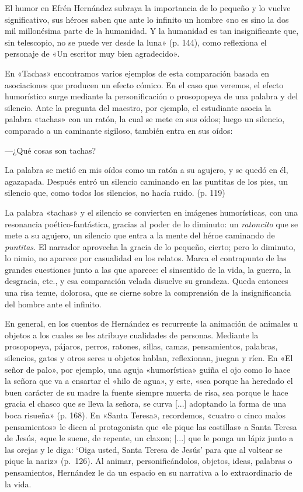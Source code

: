 \documentclass[14pt,twoside,final]{extbook} %
\begin{document}
El humor en Efrén Hernández subraya la importancia de lo pequeño y lo vuelve significativo, sus héroes saben que ante lo infinito un hombre «no es sino la dos mil millonésima parte de la humanidad. Y la humanidad es tan insignificante que, sin telescopio, no se puede ver desde la luna» (p. 144), como reflexiona el personaje de «Un escritor muy bien agradecido».

En «Tachas» encontramos varios ejemplos de esta comparación basada en asociaciones que producen un efecto cómico. En el caso que veremos, el efecto humorístico surge mediante la personificación o prosopopeya de una palabra y del silencio. Ante la pregunta del maestro, por ejemplo, el estudiante asocia la palabra «tachas» con un ratón, la cual se mete en sus oídos; luego un silencio, comparado a un caminante sigiloso, también entra en sus oídos:
\begin{quoting}
---¿Qué cosas son tachas?

La palabra se metió en mis oídos como un ratón a su agujero, y se quedó en él, agazapada. Después entró un silencio caminando en las puntitas de los pies, un silencio que, como todos los silencios, no hacía ruido. (p. 119)
\end{quoting}
La palabra «tachas» y el silencio se convierten en imágenes humorísticas, con una resonancia poético-fantástica, gracias al poder de lo diminuto: un \emph{ratoncito} que se mete a su agujero, un silencio que entra a la mente del héroe caminando de \emph{puntitas.} El narrador aprovecha la gracia de lo pequeño, cierto; pero lo diminuto, lo nimio, no aparece por casualidad en los relatos. Marca el contrapunto de las grandes cuestiones junto a las que aparece: el sinsentido de la vida, la guerra, la desgracia, etc., y esa comparación velada disuelve su grandeza. Queda entonces una risa tenue, dolorosa, que se cierne sobre la comprensión de la insignificancia del hombre ante el infinito.

En general, en los cuentos de Hernández es recurrente la animación de animales u objetos a los cuales se les atribuye cualidades de personas. Mediante la prosopopeya, pájaros, perros, ratones, sillas, camas, pensamientos, palabras, silencios, gatos y otros seres u objetos hablan, reflexionan, juegan y ríen. En «El señor de palo», por ejemplo, una aguja «humorística» guiña el ojo como lo hace la señora que va a ensartar el «hilo de agua», y este, «sea porque ha heredado el buen carácter de su madre la fuente siempre muerta de risa, sea porque le hace gracia el chasco que se lleva la señora, se curva [...] adoptando la forma de una boca risueña» (p. 168). En «Santa Teresa», recordemos, «cuatro o cinco malos pensamientos» le dicen al protagonista que «le pique las costillas» a Santa Teresa de Jesús, «que le suene, de repente, un claxon; [...] que le ponga un lápiz junto a las orejas y le diga: `Oiga usted, Santa Teresa de Jesús' para que al voltear se pique la nariz» (p.~126). Al animar, personificándolos, objetos, ideas, palabras o pensamientos, Hernández le da un espacio en su narrativa a lo extraordinario de la vida.
\end{document}
